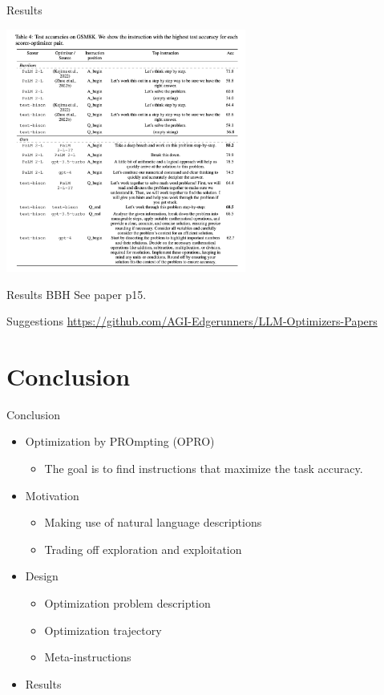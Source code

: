 \documentclass[aspectratio=1610,xcolor={dvipsnames},hyperref={colorlinks,unicode,linkcolor=violet,anchorcolor=BlueViolet,citecolor=YellowOrange,filecolor=black,urlcolor=Aquamarine}]{beamer}
\begin{document}
\begin{frame}[label={sec:org235868d}]{Results}
\begin{center}
\includegraphics[height=8cm]{./p8.png}
\end{center}
\end{frame}
\begin{frame}[label={sec:org4392767}]{Results BBH}
See paper p15.
\end{frame}
\begin{frame}[label={sec:org1af3f91}]{Suggestions}
\url{https://github.com/AGI-Edgerunners/LLM-Optimizers-Papers}
\end{frame}
\section{Conclusion}
\label{sec:orge21aa08}

\begin{frame}[label={sec:orgaeb87e2}]{Conclusion}
\begin{itemize}
\item Optimization by PROmpting (OPRO)
\begin{itemize}
\item The goal is to find instructions that maximize the task accuracy.
\end{itemize}
\item Motivation
\begin{itemize}
\item Making use of natural language descriptions
\item Trading off exploration and exploitation
\end{itemize}
\item Design
\begin{itemize}
\item Optimization problem description
\item Optimization trajectory
\item Meta-instructions
\end{itemize}
\item Results
\end{itemize}
\end{frame}
\end{document}
